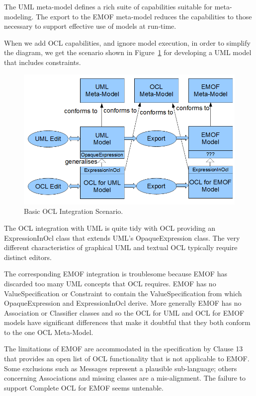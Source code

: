 \documentclass{eceasst}
\begin{document}
The UML meta-model defines a rich suite of capabilities suitable for meta-modeling. The export to the EMOF meta-model reduces the capabilities to those necessary to support effective use of models at run-time.

When we add OCL capabilities, and ignore model execution, in order to simplify the diagram, we get the scenario shown in Figure~\ref{fig:BasicOCLScenario} for developing a UML model that includes constraints.

\begin{figure}
  \begin{center}
    \includegraphics[width=4.5in]{BasicOCLScenario.png}
  \end{center}
  \caption{Basic OCL Integration Scenario.}
  \label{fig:BasicOCLScenario}
\end{figure}

The OCL integration with UML is quite tidy with OCL providing an ExpressionInOcl class that extends UML's OpaqueExpression class. The very different characteristics of graphical UML and textual OCL typically require distinct editors.

The corresponding EMOF integration is troublesome because EMOF has discarded too many UML concepts that OCL requires. EMOF has no ValueSpecification or Constraint to contain the ValueSpecification from which OpaqueExpression and ExpressionInOcl derive. More generally EMOF has no Association or Classifier classes and so the OCL for UML and OCL for EMOF models have significant differences that make it doubtful that they both conform to the one OCL Meta-Model.

The limitations of EMOF are accommodated in the specification by Clause 13 that provides an open list of OCL functionality that is not applicable to EMOF. Some exclusions such as Messages represent a plausible sub-language; others concerning Associations and missing classes are a mis-alignment. The failure to support Complete OCL for EMOF seems untenable.
\end{document}
